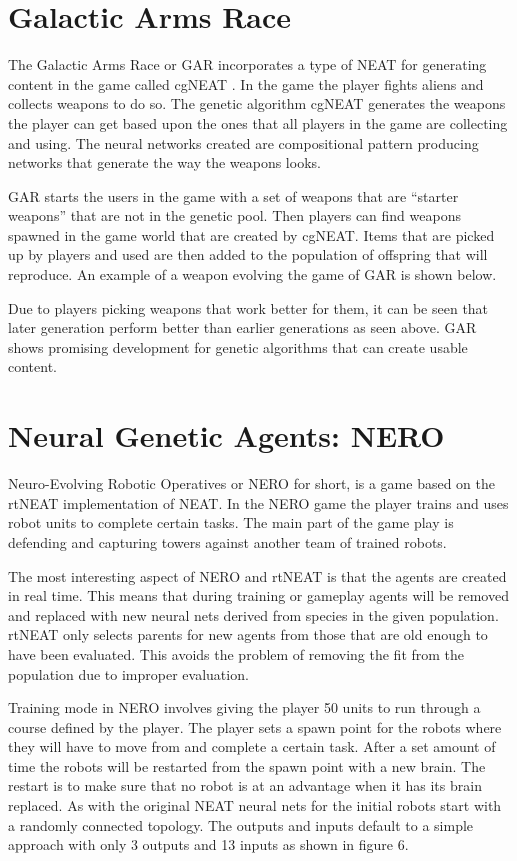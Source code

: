 \documentclass[12pt]{ucthesis} \newif\ifpdf \ifx\pdfoutput\undefined
\begin{document}
\section{Galactic Arms Race}

The Galactic Arms Race or GAR incorporates a type of NEAT for generating content
in the game called cgNEAT \cite{hastings2009evolving}. In the game the player
fights aliens and collects weapons to do so. The genetic algorithm cgNEAT generates the weapons the player
can get based upon the ones that all players in the game are collecting and
using. The neural networks created are compositional pattern producing networks
that generate the way the weapons looks\cite{hastings2009evolving}.

GAR starts the users in the game with a set of weapons that are “starter
weapons” that are not in the genetic pool. Then players can find weapons spawned
in the game world that are created by cgNEAT. Items that are picked up by
players and used are then added to the population of offspring that will
reproduce. An example of a weapon evolving the game of GAR is shown
below\cite{hastings2009evolving}.

Due to players picking weapons that work better for them, it can be seen that
later generation perform better than earlier generations as seen above. GAR
shows promising development for genetic algorithms that can create usable
content.

\section{Neural Genetic Agents: NERO}
  
Neuro-Evolving Robotic Operatives or NERO for short, is a game based on the
rtNEAT implementation of NEAT\cite{stanley:cig05}. In the NERO game the player
trains and uses robot units to complete certain tasks. The main part of the game play is
defending and capturing towers against another team of trained robots.

The most interesting aspect of NERO and rtNEAT is that the agents are created in
real time. This means that during training or gameplay agents will be removed
and replaced with new neural nets derived from species in the given population.
rtNEAT only selects parents for new agents from those that are old enough to
have been evaluated. This avoids the problem of removing the fit from the
population due to improper evaluation.

Training mode in NERO involves giving the player 50 units to run through a
course defined by the player. The player sets a spawn point for the robots where
they will have to move from and complete a certain task. After a set amount of
time the robots will be restarted from the spawn point with a new brain. The
restart is to make sure that no robot is at an advantage when it has its brain
replaced. As with the original NEAT neural nets for the initial robots start
with a randomly connected topology. The outputs and inputs default to a simple
approach with only 3 outputs and 13 inputs as shown in figure 6.
\end{document}
